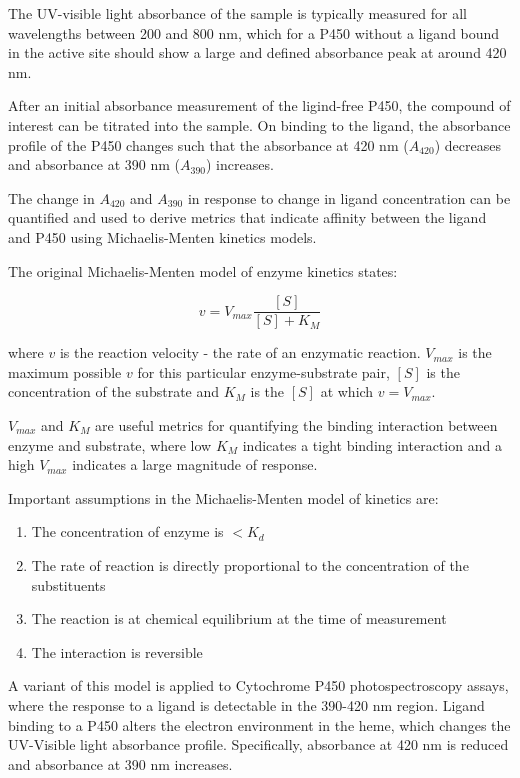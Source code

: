 \documentclass[16pt]{book}
\begin{document}
The UV-visible light absorbance of the sample is typically measured for all wavelengths between 200 and 800 nm, which for a P450 without a ligand bound in the active site should show a large and defined absorbance peak at around 420 nm.
\par
After an initial absorbance measurement of the ligind-free P450, the compound of interest can be titrated into the sample.
On binding to the ligand, the absorbance profile of the P450 changes such that the absorbance at 420 nm ($A_{420}$) decreases and absorbance at 390 nm ($A_{390}$) increases.
\par
The change in $A_{420}$ and $A_{390}$ in response to change in ligand concentration can be quantified and used to derive metrics that indicate affinity between the ligand and P450 using Michaelis-Menten kinetics models.
\par
The original Michaelis-Menten model of enzyme kinetics states:

\begin{equation}
	v = V_{max} \frac{[S]}{[S] + K_M} 
\end{equation}

where $v$ is the reaction velocity - the rate of an enzymatic reaction. 
$V_{max}$ is the maximum possible $v$ for this particular enzyme-substrate pair, $[S]$ is the concentration of the substrate and $K_M$ is the $[S]$ at which $v = V_{max}$.
\par
$V_{max}$ and $K_M$ are useful metrics for quantifying the binding interaction between enzyme and substrate, where low $K_M$ indicates a tight binding interaction and a high $V_{max}$ indicates a large magnitude of response.

Important assumptions in the Michaelis-Menten model of kinetics are:

\begin{enumerate}
	\item The concentration of enzyme is $< K_d$ 
	\item The rate of reaction is directly proportional to the concentration of the substituents
	\item The reaction is at chemical equilibrium at the time of measurement
	\item The interaction is reversible
\end{enumerate}

A variant of this model is applied to Cytochrome P450 photospectroscopy assays, where the response to a ligand is detectable in the 390-420 nm region.
Ligand binding to a P450 alters the electron environment in the heme, which changes the UV-Visible light absorbance profile.
Specifically, absorbance at 420 nm is reduced and absorbance at 390 nm increases.
\end{document}
